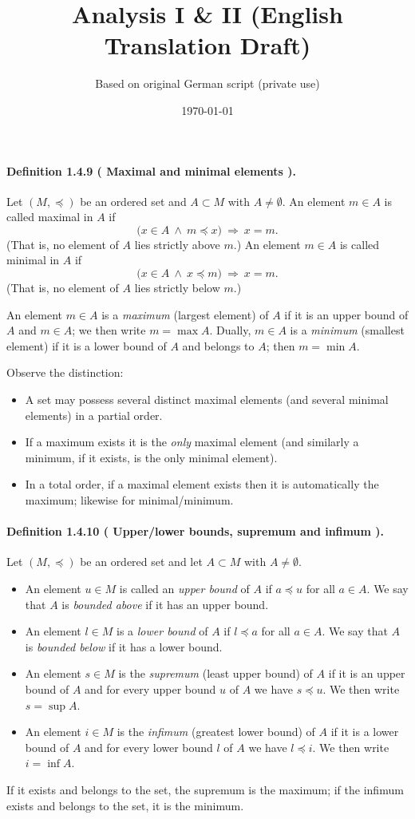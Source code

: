 \documentclass[12pt,a4paper]{article}
\title{Analysis I \& II \newline\small (English Translation Draft)}
\author{Based on original German script (private use)}
\date{\today}
\newcommand{\NumberedDefinition}[3]{%
\paragraph*{Definition #1 ( #2 ).} #3\par}
\theoremstyle{plain}
\theoremstyle{definition}
\theoremstyle{remark}
\begin{document}
\maketitle
\hypersetup{linktoc=all} %
\tableofcontents
\newpage
\NumberedDefinition{1.4.9}{Maximal and minimal elements}{Let \((M,\preceq)\) be an ordered set and \(A\subset M\) with \(A\neq\emptyset\). An element \(m\in A\) is called maximal in \(A\) if
\[
\bigl(x\in A \ \wedge\ m\preceq x\bigr)\ \Longrightarrow\ x = m.
\]
(That is, no element of \(A\) lies strictly above \(m\).)
An element \(m\in A\) is called minimal in \(A\) if
\[
\bigl(x\in A \ \wedge\ x\preceq m\bigr)\ \Longrightarrow\ x = m.
\]
(That is, no element of \(A\) lies strictly below \(m\).)
\label{def:1.4.9}}

An element \(m\in A\) is a \emph{maximum} (largest element) of \(A\) if it is an upper bound of \(A\) and \(m\in A\); we then write \(m=\max A\). Dually, \(m\in A\) is a \emph{minimum} (smallest element) if it is a lower bound of \(A\) and belongs to \(A\); then \(m=\min A\).

Observe the distinction:
\begin{itemize}[leftmargin=*]
	\item A set may possess several distinct maximal elements (and several minimal elements) in a partial order.
	\item If a maximum exists it is the \emph{only} maximal element (and similarly a minimum, if it exists, is the only minimal element).
	\item In a total order, if a maximal element exists then it is automatically the maximum; likewise for minimal/minimum.
\end{itemize}

\NumberedDefinition{1.4.10}{Upper/lower bounds, supremum and infimum}{Let \((M,\preceq)\) be an ordered set and let \(A\subset M\) with \(A\neq\emptyset\).
\begin{itemize}[leftmargin=*]
	\item An element \(u\in M\) is called an \emph{upper bound} of \(A\) if \(a\preceq u\) for all \(a\in A\). We say that \(A\) is \emph{bounded above} if it has an upper bound.
	\item An element \(l\in M\) is a \emph{lower bound} of \(A\) if \(l\preceq a\) for all \(a\in A\). We say that \(A\) is \emph{bounded below} if it has a lower bound.
	\item An element \(s\in M\) is the \emph{supremum} (least upper bound) of \(A\) if it is an upper bound of \(A\) and for every upper bound \(u\) of \(A\) we have \(s\preceq u\). We then write \(s=\sup A\).
	\item An element \(i\in M\) is the \emph{infimum} (greatest lower bound) of \(A\) if it is a lower bound of \(A\) and for every lower bound \(l\) of \(A\) we have \(l\preceq i\). We then write \(i=\inf A\).
\end{itemize}
If it exists and belongs to the set, the supremum is the maximum; if the infimum exists and belongs to the set, it is the minimum.
}
\end{document}
